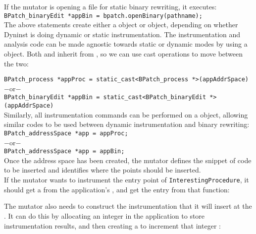 If the mutator is opening a file for static binary rewriting, it executes:\\

\texttt{BPatch\_binaryEdit *appBin = bpatch.openBinary(pathname);}\\

The above statements create either a \BPatchprocess object or \BPatchbinaryEdit object, depending on whether Dyninst is doing dynamic or static instrumentation.  The instrumentation and analysis code can be made agnostic towards static or dynamic modes by using a \BPatchaddressSpace object.  Both \BPatchprocess and \BPatchbinaryEdit inherit from \BPatchaddressSpace, so we can use cast operations to move between the two:

\texttt{BPatch\_process *appProc = static\_cast<BPatch\_process *>(appAddrSpace)}\\
$-$or$-$\\
\texttt{BPatch\_binaryEdit *appBin = static\_cast<BPatch\_binaryEdit *>(appAddrSpace)}\\

Similarly, all instrumentation commands can be performed on a \BPatchaddressSpace object, allowing similar codes to be used between dynamic instrumentation and binary rewriting:\\

\texttt{BPatch\_addressSpace *app = appProc;}\\
$-$or$-$\\
\texttt{BPatch\_addressSpace *app = appBin;}\\

Once the address space has been created, the mutator defines the snippet of code to be inserted and identifies where the points should be inserted.\\

If the mutator wants to instrument the entry point of \texttt{InterestingProcedure}, it should get a \BPatchfunction from the application’s \BPatchimage, and get the entry \BPatchpoint from that function:


The mutator also needs to construct the instrumentation that it will insert at the \BPatchpoint.  It can do this by allocating an integer in the application to store instrumentation results, and then creating a \BPatchsnippet to increment that integer
:

